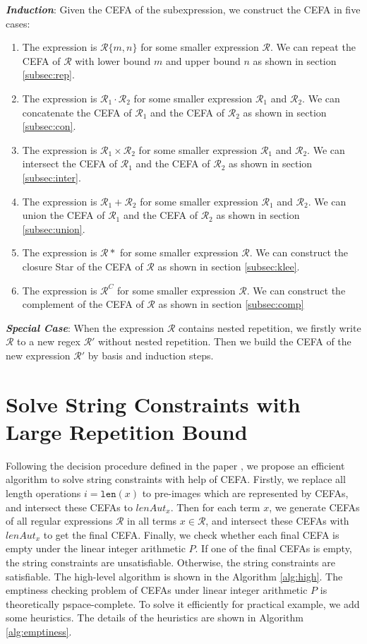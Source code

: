 \documentclass[runningheads]{llncs}
\newcommand*{\regex}{\mathcal{R}}
\newcommand*{\highlight}[1]{\textbf{\textit{#1}}}
\newcommand*{\strlen}[1]{\texttt{len}(#1)}
\begin{document}
\highlight{Induction}: Given the CEFA of the subexpression, we construct the CEFA in five cases:
\begin{enumerate}
  \item The expression is $\regex\{m,n\}$ for some smaller expression $\regex$. We can repeat the CEFA of $\regex$ with lower bound $m$ and upper bound $n$ as shown in section \ref{subsec:rep}.
  \item The expression is $\regex_1\cdot\regex_2$ for some smaller expression $\regex_1$ and $\regex_2$. We can concatenate the CEFA of $\regex_1$ and the CEFA of $\regex_2$ as shown in section \ref{subsec:con}.
  \item The expression is $\regex_1\times \regex_2$ for some smaller expression $\regex_1$ and $\regex_2$. We can intersect the CEFA of $\regex_1$ and the CEFA of $\regex_2$ as shown in section \ref{subsec:inter}.
  \item The expression is $\regex_1 + \regex_2$ for some smaller expression $\regex_1$ and $\regex_2$. We can union the CEFA of $\regex_1$ and the CEFA of $\regex_2$ as shown in section \ref{subsec:union}.
  \item The expression is $\regex*$ for some smaller expression $\regex$. We can construct the closure Star of the CEFA of $\regex$  as shown in section \ref{subsec:klee}.
  \item The expression is $\regex^C$ for some smaller expression $\regex$. We can construct the complement of the CEFA of $\regex$  as shown in section \ref{subsec:comp}
\end{enumerate}
\highlight{Special Case}: When the expression $\regex$ contains nested repetition, we firstly write $\regex$ to a new regex $\regex'$ without nested repetition. Then we build the CEFA of the new expression $\regex'$ by basis and induction steps.

\section{Solve String Constraints with Large Repetition Bound} \label{sec:solve}
Following the decision procedure defined in the paper \cite{atva2020}, we propose an efficient algorithm to solve string constraints with help of CEFA. Firstly, we replace all length operations $i=\strlen{x}$ to pre-images which are represented by CEFAs, and intersect these CEFAs to $lenAut_x$. Then for each term $x$, we generate CEFAs of all regular expressions $\regex$ in all terms $x\in \regex$, and intersect these CEFAs with $lenAut_x$ to get the final CEFA. Finally, we check whether each final CEFA is empty under the linear integer arithmetic $P$. If one of the final CEFAs is empty, the string constraints are unsatisfiable. Otherwise, the string constraints are satisfiable. The high-level algorithm is shown in the Algorithm \ref{alg:high}.\newline
The emptiness checking problem of CEFAs under linear integer arithmetic $P$ is theoretically pspace-complete\cite{atva2020}. To solve it efficiently for practical example, we add some heuristics. The details of the heuristics are shown in Algorithm \ref{alg:emptiness}.
\end{document}
